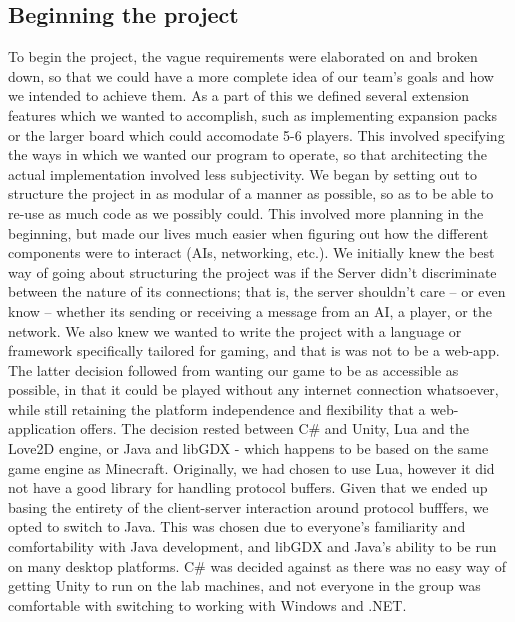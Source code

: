 \documentclass[a4paper,doc]{apa6}
\begin{document}
\subsection{Beginning the project}
To begin the project, the vague requirements were elaborated on and broken down, so that we could have a more complete idea of our team's goals and how we intended to achieve them. As a part of this we defined several extension features which we wanted to accomplish, such as implementing expansion packs or the larger board which could accomodate 5-6 players. This involved specifying the ways in which we wanted our program to operate, so that architecting the actual implementation involved less subjectivity. We began by setting out to structure the project in as modular of a manner as possible, so as to be able to re-use as much code as we possibly could. This involved more planning in the beginning, but made our lives much easier when figuring out how the different components were to interact (AIs, networking, etc.). We initially knew the best way of going about structuring the project was if the Server didn't discriminate between the nature of its connections; that is, the server shouldn't care -- or even know -- whether its sending or receiving a message from an AI, a player, or the network. We also knew we wanted to write the project with a language or framework specifically tailored for gaming, and that is was not to be a web-app. The latter decision followed from wanting our game to be as accessible as possible, in that it could be played without any internet connection whatsoever, while still retaining the platform independence and flexibility that a web-application offers. The decision rested between C\# and Unity, Lua and the Love2D engine, or Java and libGDX - which happens to be based on the same game engine as Minecraft. Originally, we had chosen to use Lua, however it did not have a good library for handling protocol buffers. Given that we ended up basing the entirety of the client-server interaction around protocol bufffers, we opted to switch to Java. This was chosen due to everyone's familiarity and comfortability with Java development, and libGDX and Java's ability to be run on many desktop platforms. C\# was decided against as there was no easy way of getting Unity to run on the lab machines, and not everyone in the group was comfortable with switching to working with Windows and .NET. 
\end{document}
